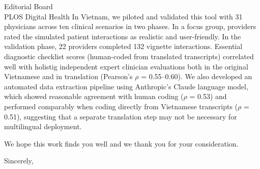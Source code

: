 \documentclass[11pt]{letter}
\begin{document}
\begin{letter}{Editorial Board\\
PLOS Digital Health}
In Vietnam, we piloted and validated this tool with 31 physicians across ten clinical scenarios in two phases. In a focus group, providers rated the simulated patient interactions as realistic and user-friendly. In the validation phase, 22 providers completed 132 vignette interactions. Essential diagnostic checklist scores (human-coded from translated transcripts) correlated well with holistig independent expert clinician evaluations both in the original Vietnamese and in translation (Pearson's $\rho$ = 0.55--0.60). We also developed an automated data extraction pipeline using Anthropic's Claude language model, which showed reasonable agreement with human coding ($\rho$ = 0.53) and performed comparably when coding directly from Vietnamese transcripts ($\rho$ = 0.51), suggesting that a separate translation step may not be necessary for multilingual deployment.

We hope this work finds you well and we thank you for your consideration.

\closing{Sincerely,}

\end{letter}
\end{document}
